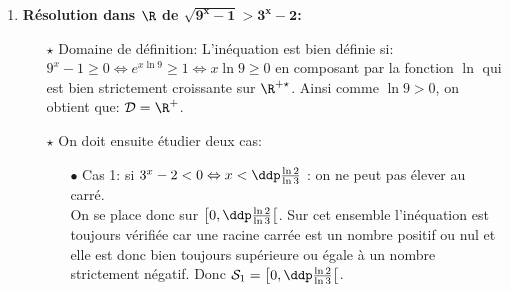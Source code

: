\begin{correction}
\begin{enumerate}
\begin{itemize}
\begin{itemize}
\item[$\bullet$] Cas 2: $\ddp\frac{x-3}{x-1} \leq 0\Leftrightarrow x\in\rbrack  1, 3 \rbrack$.\\
\noindent On doit alors r\'esoudre l'in\'equation $1\leq -\ddp\frac{x-3}{x-1}\leq 3$. Les r\'eels $x$ doivent donc v\'erifier $1\leq \ddp\frac{3-x}{x-1}$ et $\ddp\frac{3-x}{x-1}\leq 3$. La r\'esolution de la premi\`ere in\'equation donne
$$\begin{array}{lll}
\ddp\frac{3-x}{x-1}\geq 1 &\Leftrightarrow & \ddp\frac{-2x+4}{x-1}\geq 0.
\end{array}$$
Un tableau de signe permet de trouver le premier ensemble de d\'efinition.
Le premier ensemble solution est ainsi $\rbrack 1,2\rbrack$. La deuxi\`eme in\'equation donne
$$\ddp\frac{3-x}{x-1}\leq 3 \; \Leftrightarrow \; \ddp\frac{3-x}{x-1}- 3\leq 0 \; \Leftrightarrow \; \ddp\frac{-2x+3}{x-1}\leq 0.$$
Un tableau de signe donne alors que le deuxi\`eme ensemble solution est alors $\left \lbrack \ddp\frac{3}{2},3\right\rbrack$.\\
\noindent On obtient ainsi, en faisant l'intersection de ces deux ensembles et en v\'erifiant qu'on est bien aussi dans $\rbrack  1, 3 \rbrack$, que $\mathcal{S}_2=\left\lbrack \ddp\frac{3}{2},2\right\rbrack$.
\end{itemize}
Synth\`ese : l'ensemble des solutions correspond alors \`a la r\'eunion des deux sous-ensembles $\mathcal{S}_1$ et $\mathcal{S}_2$. Ainsi, on obtient : .
\end{itemize} 
\item \textbf{R\'esolution dans $\mathbf{\R}$ de $\mathbf{\sqrt{9^x-1}>3^x-2}$:}\\
\noindent 
\noindent \begin{itemize}
\item[$\star$] Domaine de d\'efinition: L'in\'equation est bien d\'efinie si: $9^x-1\geq0\Leftrightarrow e^{x\ln{9}}\geq 1\Leftrightarrow x\ln{9}\geq 0$ en composant par la fonction $\ln{}$ qui est bien strictement croissante sur $\R^{+\star}$. Ainsi comme $\ln{9}>0$, on obtient que: $\mathcal{D}=\R^+$.
\item[$\star$]  On doit ensuite \'etudier deux cas:
\begin{itemize}
\item[$\bullet$] Cas 1: si $3^x-2< 0\Leftrightarrow x<\ddp\frac{\ln{2}}{\ln{3}} $ : on ne peut pas \'elever au carr\'e.\\
\noindent On se place donc sur $\left\lbrack 0,\ddp\frac{\ln{2}}{\ln{3}} \right\lbrack$. Sur cet ensemble l'in\'equation est toujours v\'erifi\'ee car une racine carr\'ee est un nombre positif ou nul et elle est donc bien toujours sup\'erieure ou \'egale \`{a} un  nombre strictement n\'egatif. Donc $\mathcal{S}_1=\left\lbrack 0,\ddp\frac{\ln{2}}{\ln{3}} \right\lbrack$.

\end{itemize}
\end{itemize}
\end{enumerate}
\end{correction}
